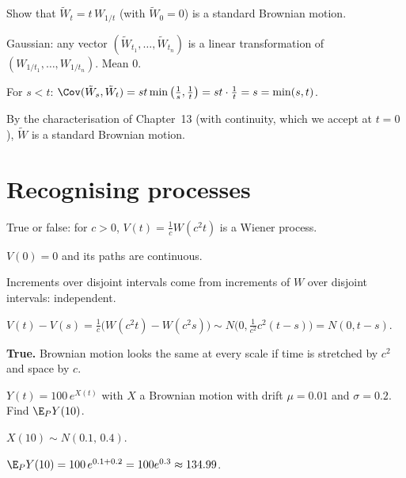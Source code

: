 \begin{problem}
Show that $\tilde W_t=t\,W_{1/t}$ (with $\tilde W_0=0$) is a standard Brownian motion.
\begin{steps}
  \item Gaussian: any vector $(\tilde W_{t_1},\dots,\tilde W_{t_n})$ is a linear transformation of $(W_{1/t_1},\dots,W_{1/t_n})$. Mean $0$.
  \item For $s<t$: $\Cov(\tilde W_s,\tilde W_t)=st\min\big(\frac1s,\frac1t\big)=st\cdot\frac1t=s=\min(s,t)$.
  \item By the characterisation of Chapter~13 (with continuity, which we accept at $t=0$), $\tilde W$ is a standard Brownian motion.
\end{steps}
\end{problem}

\section{Recognising processes}

\begin{problem}[Scaling]
True or false: for $c>0$, $V(t)=\frac1cW(c^2t)$ is a Wiener process.
\begin{steps}
  \item $V(0)=0$ and its paths are continuous.
  \item Increments over disjoint intervals come from increments of $W$ over disjoint intervals: independent.
  \item $V(t)-V(s)=\frac1c\big(W(c^2t)-W(c^2s)\big)\sim N\big(0,\frac{1}{c^2}c^2(t-s)\big)=N(0,t-s)$.
\end{steps}
\textbf{True.} Brownian motion looks the same at every scale if time is stretched by $c^2$ and space by $c$.
\end{problem}

\begin{problem}
$Y(t)=100\,e^{X(t)}$ with $X$ a Brownian motion with drift $\mu=0.01$ and $\sigma=0.2$. Find $\E_PY(10)$.
\begin{steps}
  \item $X(10)\sim N(0.1,\,0.4)$.
  \item $\E_PY(10)=100\,e^{0.1+0.2}=100e^{0.3}\approx134.99$.
\end{steps}
\end{problem}

